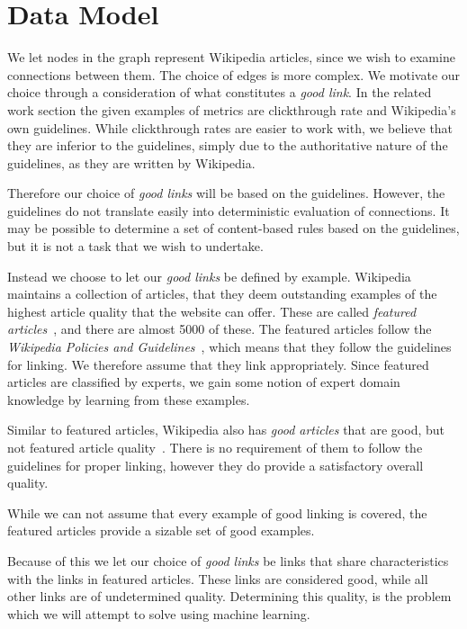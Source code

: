 \section{Data Model}\label{sec:choice_of_graph}

We let nodes in the graph represent Wikipedia articles, since we wish to examine connections between them. The choice of edges is more complex. We motivate our choice through a consideration of what constitutes a \emph{good link}. In the related work section the given examples of metrics are clickthrough rate and Wikipedia's own guidelines. While clickthrough rates are easier to work with, we believe that they are inferior to the guidelines, simply due to the authoritative nature of the guidelines, as they are written by Wikipedia. 

Therefore our choice of \emph{good links} will be based on the guidelines. However, the guidelines do not translate easily into deterministic evaluation of connections. It may be possible to determine a set of content-based rules based on the guidelines, but it is not a task that we wish to undertake.

Instead we choose to let our \emph{good links} be defined by example. Wikipedia maintains a collection of articles, that they deem outstanding examples of the highest article quality that the website can offer. These are called \emph{featured articles}~\cite{wiki-featured-articles}, and there are almost 5000 of these. The featured articles follow the \emph{Wikipedia Policies and Guidelines}~\cite{wiki-editor-guidelines}, which means that they follow the guidelines for linking. We therefore assume that they link appropriately. Since featured articles are classified by experts, we gain some notion of expert domain knowledge by learning from these examples.

Similar to featured articles, Wikipedia also has \emph{good articles} that are good, but not featured article quality~\cite{wiki-good-articles}. There is no requirement of them to follow the guidelines for proper linking, however they do provide a satisfactory overall quality.

While we can not assume that every example of good linking is covered, the featured articles provide a sizable set of good examples.

Because of this we let our choice of \emph{good links} be links that share characteristics with the links in featured articles. These links are considered good, while all other links are of undetermined quality. Determining this quality, is the problem which we will attempt to solve using machine learning.


